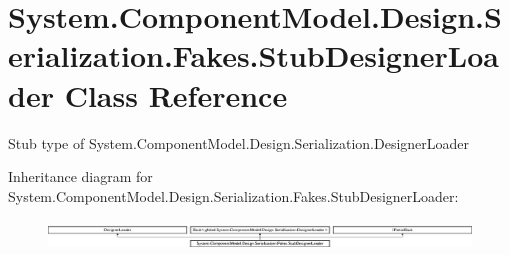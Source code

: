 \hypertarget{class_system_1_1_component_model_1_1_design_1_1_serialization_1_1_fakes_1_1_stub_designer_loader}{\section{System.\-Component\-Model.\-Design.\-Serialization.\-Fakes.\-Stub\-Designer\-Loader Class Reference}
\label{class_system_1_1_component_model_1_1_design_1_1_serialization_1_1_fakes_1_1_stub_designer_loader}
}


Stub type of System.\-Component\-Model.\-Design.\-Serialization.\-Designer\-Loader 


Inheritance diagram for System.\-Component\-Model.\-Design.\-Serialization.\-Fakes.\-Stub\-Designer\-Loader\-:\begin{figure}[H]
\begin{center}
\leavevmode
\includegraphics[height=0.806336cm]{class_system_1_1_component_model_1_1_design_1_1_serialization_1_1_fakes_1_1_stub_designer_loader}
\end{center}
\end{figure}
